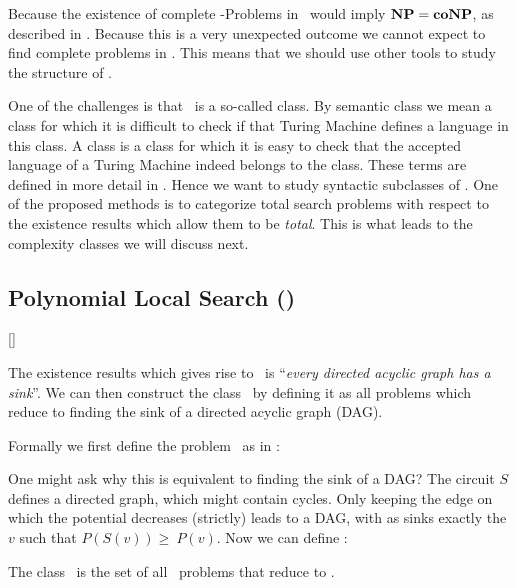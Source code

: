 Because the existence of complete \FNP-Problems in \TFNP\, would imply $\textbf{NP} = \textbf{coNP}$, as described in .
Because this is a very unexpected outcome we cannot expect to find complete problems in \TFNP{}.
This means that we should use other tools to study the structure of \TFNP{}. \par
One of the challenges is that \TFNP\ is a so-called  class.
By semantic class we mean a class for which it is difficult to check if that Turing Machine defines a language in this class.
A  class is a class for which it is easy to check that the accepted language of a Turing Machine indeed belongs to the class.
These terms are defined in more detail in .
Hence we want to study syntactic subclasses of \TFNP.
One of the proposed methods  is to categorize total search problems with respect to the existence results which allow
them to be \textit{total}. This is what leads to the complexity classes we will discuss next.

\subsection{Polynomial Local Search (\PLS)}[\PLS]

The existence results which gives rise to \PLS\ is ``\textit{every directed acyclic graph has a sink}''.
We can then construct the class \PLS\ by defining it as all problems which reduce to finding the sink of a directed acyclic graph (DAG). \par
Formally we first define the problem \Localopt\ as in :


One might ask why this is equivalent to finding the sink of a DAG\@?
The circuit $S$ defines a directed graph, which might contain cycles.
Only keeping the edge on which the potential decreases (strictly) leads to a DAG, with as sinks exactly the $v$ such that $P(S(v)) \geq\ P(v)$. Now we can
define \PLS{}:

\begin{definition}
    The class \PLS\ is the set of all \TFNP\ problems that reduce to \Localopt.
\end{definition}

